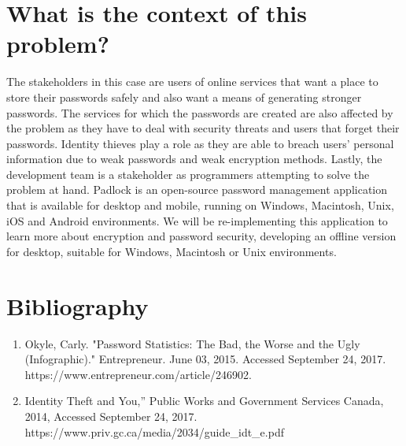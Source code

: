 \documentclass{article}
\begin{document}
\section*{What is the context of this problem?}
The stakeholders in this case are users of online services that want a place to store their passwords safely and also want a means of generating stronger passwords. The services for which the passwords are created are also affected by the problem as they have to deal with security threats and users that forget their passwords. Identity thieves play a role as they are able to breach users’ personal information due to weak passwords and weak encryption methods. Lastly, the development team is a stakeholder as programmers attempting to solve the problem at hand. Padlock is an open-source password management application that is available for desktop and mobile, running on Windows, Macintosh, Unix, iOS and Android environments. We will be re-implementing this application to learn more about encryption and password security, developing an offline version for desktop, suitable for Windows, Macintosh or Unix environments. 

\section*{Bibliography}
\begin{enumerate}
    \item Okyle, Carly. "Password Statistics: The Bad, the Worse and the Ugly (Infographic)." Entrepreneur. June 03, 2015. Accessed September 24, 2017. https://www.entrepreneur.com/article/246902.
    \item Identity Theft and You,” Public Works and Government Services Canada, 2014, Accessed September 24, 2017.\\ https://www.priv.gc.ca/media/2034/guide\_idt\_e.pdf
\end{enumerate}
\end{document}
